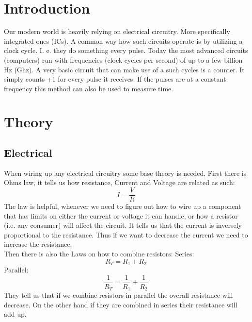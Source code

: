 \documentclass[fleqn,14pt]{article}
\begin{document}


\section{Introduction}
Our modern world is heavily relying on electrical circuitry. More specifically integrated ones (ICs).
A common way how such circuits operate is by utilizing a clock cycle. I. e. they do something every pulse.
Today the most advanced circuits (computers) run with frequencies (clock cycles per second) of up to
a few billion Hz (Ghz). A very basic circuit that can make use of a such cycles is a counter.
It simply counts +1 for every
pulse it receives. If the pulses are at a constant frequency this method can also be used to measure time.

\section{Theory}
\subsection{Electrical}

When wiring up any electrical circuitry some base theory is needed. First there is Ohms law,
it tells us how resistance,
Current and Voltage are related as such:
$$
I = \frac{V}{R}
$$
The law is helpful, whenever we need to figure out how to wire up a component that has limits
on either the current or voltage it can handle,
or how a resistor (i.e. any consumer) will affect the circuit. It tells us that the current
is inversely proportional to the resistance. Thus if we want to decrease the current we need
to increase the resistance.\\
Then there is also the Laws on how to combine resistors:
\newline
\newline
Series:
$$
R_T = R_1 + R_2
$$
Parallel:
$$
\frac{1}{R_T} = \frac{1}{R_1} + \frac{1}{R_2}
$$
They tell us that if we combine resistors in parallel the overall resistance will decrease.
On the other hand if they are combined in series their resistance will add up.
\end{document}
